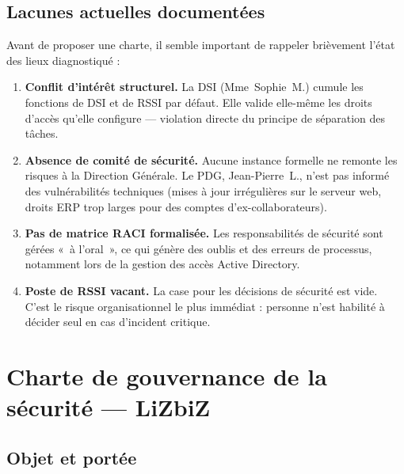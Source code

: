 \documentclass[12pt,a4paper]{article}
\begin{document}
\subsection{Lacunes actuelles documentées}

Avant de proposer une charte, il semble important de rappeler
brièvement l'état des lieux diagnostiqué :

\begin{boxcritique}
\begin{enumerate}
    \item \textbf{Conflit d'intérêt structurel.}
    La DSI (Mme~Sophie~M.) cumule les fonctions de DSI et de RSSI par
    défaut. Elle valide elle-même les droits d'accès qu'elle configure ---
    violation directe du principe de séparation des tâches.

    \item \textbf{Absence de comité de sécurité.}
    Aucune instance formelle ne remonte les risques à la Direction
    Générale. Le PDG, Jean-Pierre~L., n'est pas informé des
    vulnérabilités techniques (mises à jour irrégulières sur le serveur
    web, droits ERP trop larges pour des comptes d'ex-collaborateurs).

    \item \textbf{Pas de matrice RACI formalisée.}
    Les responsabilités de sécurité sont gérées «~à l'oral~», ce qui
    génère des oublis et des erreurs de processus, notamment lors de la
    gestion des accès Active Directory.

    \item \textbf{Poste de RSSI vacant.}
    La case  pour les décisions de sécurité est vide.
    C'est le risque organisationnel le plus immédiat : personne n'est
    habilité à décider seul en cas d'incident critique.
\end{enumerate}
\end{boxcritique}

\separateur

\section{Charte de gouvernance de la sécurité --- LiZbiZ}

\subsection{Objet et portée}
\end{document}

